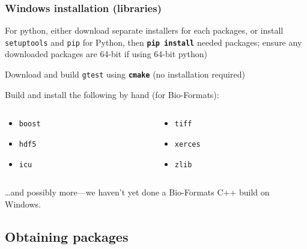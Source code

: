 \documentclass{beamer}
\newcommand{\cmd}[1]{\textbf{\texttt{#1}}}
\newcommand{\pkg}[1]{\texttt{#1}}
\begin{document}
\begin{frame}
  \frametitle{Windows installation (libraries)}

For python, either download separate installers for each packages, or
install \pkg{setuptools} and \pkg{pip} for Python, then \cmd{pip
  install} needed packages; ensure any downloaded packages are 64-bit
if using 64-bit python)
\bigskip

Download and build \pkg{gtest} using \cmd{cmake} (no installation
required)
\bigskip

Build and install the following by hand (for Bio-Formats):
  \begin{columns}
    \begin{column}{.5\linewidth}
      \begin{itemize}
      \item[] \pkg{boost}
      \item[] \pkg{hdf5}
      \item[] \pkg{icu}
      \end{itemize}
    \end{column}
    \begin{column}{.5\linewidth}
      \begin{itemize}
      \item[] \pkg{tiff}
      \item[] \pkg{xerces}
      \item[] \pkg{zlib}
      \end{itemize}
    \end{column}
  \end{columns}
…and possibly more—we haven't yet done a Bio-Formats C++ build on Windows.
\end{frame}

\subsection{Obtaining packages}
\end{document}
